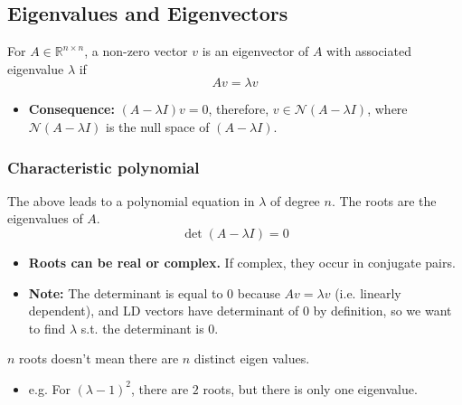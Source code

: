 \subsection{Eigenvalues and Eigenvectors}
\begin{definition}
    For $A \in \mathbb{R}^{n \times n}$, a non-zero vector $v$ is an eigenvector of $A$ with associated eigenvalue $\lambda$ if 
    \[
    A v = \lambda v
    \]
    \begin{itemize}
        \item \textbf{Consequence:} $(A - \lambda I) v = 0$, therefore, $v \in \mathcal{N}(A - \lambda I)$, where $\mathcal{N}(A - \lambda I)$ is the null space of $(A - \lambda I)$.    
    \end{itemize}
\end{definition}

\subsubsection{Characteristic polynomial}
\begin{definition} The above leads to a polynomial equation in $\lambda$ of degree $n$. The roots are the eigenvalues of $A$. 
    \[
    \det(A - \lambda I) = 0
    \]
    \begin{itemize}
        \item \textbf{Roots can be real or complex.} If complex, they occur in conjugate pairs.
        \item \textbf{Note:} The determinant is equal to 0 because $Av=\lambda v$ (i.e. linearly dependent), and LD vectors have determinant of $0$ by definition, so we want to find $\lambda$ s.t. the determinant is 0. 
    \end{itemize}
\end{definition}

\begin{warning}
    $n$ roots doesn't mean there are $n$ distinct eigen values. 
    \begin{itemize}
        \item e.g. For $(\lambda - 1)^2$, there are $2$ roots, but there is only one eigenvalue. 
    \end{itemize}
\end{warning}

